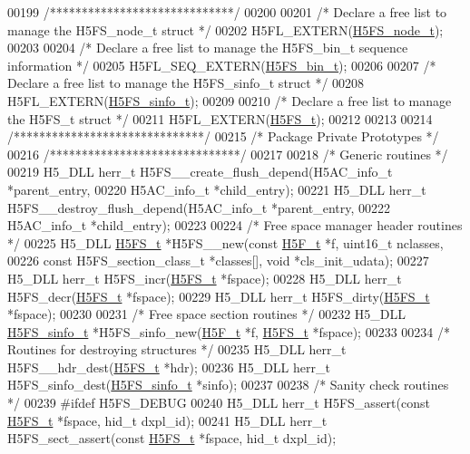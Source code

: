 \begin{DoxyCode}
00199 \textcolor{comment}{/*****************************/}
00200 
00201 \textcolor{comment}{/* Declare a free list to manage the H5FS\_node\_t struct */}
00202 H5FL\_EXTERN(\hyperlink{struct_h5_f_s__node__t}{H5FS\_node\_t});
00203 
00204 \textcolor{comment}{/* Declare a free list to manage the H5FS\_bin\_t sequence information */}
00205 H5FL\_SEQ\_EXTERN(\hyperlink{struct_h5_f_s__bin__t}{H5FS\_bin\_t});
00206 
00207 \textcolor{comment}{/* Declare a free list to manage the H5FS\_sinfo\_t struct */}
00208 H5FL\_EXTERN(\hyperlink{struct_h5_f_s__sinfo__t}{H5FS\_sinfo\_t});
00209 
00210 \textcolor{comment}{/* Declare a free list to manage the H5FS\_t struct */}
00211 H5FL\_EXTERN(\hyperlink{struct_h5_f_s__t}{H5FS\_t});
00212 
00213 
00214 \textcolor{comment}{/******************************/}
00215 \textcolor{comment}{/* Package Private Prototypes */}
00216 \textcolor{comment}{/******************************/}
00217 
00218 \textcolor{comment}{/* Generic routines */}
00219 H5\_DLL herr\_t H5FS\_\_create\_flush\_depend(H5AC\_info\_t *parent\_entry,
00220     H5AC\_info\_t *child\_entry);
00221 H5\_DLL herr\_t H5FS\_\_destroy\_flush\_depend(H5AC\_info\_t *parent\_entry,
00222     H5AC\_info\_t *child\_entry);
00223 
00224 \textcolor{comment}{/* Free space manager header routines */}
00225 H5\_DLL \hyperlink{struct_h5_f_s__t}{H5FS\_t} *H5FS\_\_new(\textcolor{keyword}{const} \hyperlink{struct_h5_f__t}{H5F\_t} *f, uint16\_t nclasses,
00226     \textcolor{keyword}{const} H5FS\_section\_class\_t *classes[], \textcolor{keywordtype}{void} *cls\_init\_udata);
00227 H5\_DLL herr\_t H5FS\_incr(\hyperlink{struct_h5_f_s__t}{H5FS\_t} *fspace);
00228 H5\_DLL herr\_t H5FS\_decr(\hyperlink{struct_h5_f_s__t}{H5FS\_t} *fspace);
00229 H5\_DLL herr\_t H5FS\_dirty(\hyperlink{struct_h5_f_s__t}{H5FS\_t} *fspace);
00230 
00231 \textcolor{comment}{/* Free space section routines */}
00232 H5\_DLL \hyperlink{struct_h5_f_s__sinfo__t}{H5FS\_sinfo\_t} *H5FS\_sinfo\_new(\hyperlink{struct_h5_f__t}{H5F\_t} *f, \hyperlink{struct_h5_f_s__t}{H5FS\_t} *fspace);
00233 
00234 \textcolor{comment}{/* Routines for destroying structures */}
00235 H5\_DLL herr\_t H5FS\_\_hdr\_dest(\hyperlink{struct_h5_f_s__t}{H5FS\_t} *hdr);
00236 H5\_DLL herr\_t H5FS\_sinfo\_dest(\hyperlink{struct_h5_f_s__sinfo__t}{H5FS\_sinfo\_t} *sinfo);
00237 
00238 \textcolor{comment}{/* Sanity check routines */}
00239 \textcolor{preprocessor}{#ifdef H5FS\_DEBUG}
00240 H5\_DLL herr\_t H5FS\_assert(\textcolor{keyword}{const} \hyperlink{struct_h5_f_s__t}{H5FS\_t} *fspace, hid\_t dxpl\_id);
00241 H5\_DLL herr\_t H5FS\_sect\_assert(\textcolor{keyword}{const} \hyperlink{struct_h5_f_s__t}{H5FS\_t} *fspace, hid\_t dxpl\_id);

\end{DoxyCode}
